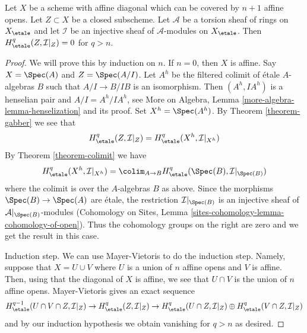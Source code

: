 \begin{lemma}
\label{lemma-vanishing-restriction-injective}
Let $X$ be a scheme with affine diagonal which can be covered by
$n + 1$ affine opens. Let $Z \subset X$ be a closed subscheme.
Let $\mathcal{A}$ be a torsion sheaf of rings on $X_\etale$
and let $\mathcal{I}$ be an injective sheaf of $\mathcal{A}$-modules
on $X_\etale$.
Then $H^q_\etale(Z, \mathcal{I}|_Z) = 0$ for $q > n$.
\end{lemma}

\begin{proof}
We will prove this by induction on $n$. If $n = 0$, then $X$ is affine.
Say $X = \Spec(A)$ and $Z = \Spec(A/I)$. Let $A^h$ be the filtered colimit
of \'etale $A$-algebras $B$ such that $A/I \to B/IB$ is an isomorphism.
Then $(A^h, IA^h)$ is a henselian pair and $A/I = A^h/IA^h$, see
More on Algebra, Lemma \ref{more-algebra-lemma-henselization}
and its proof. Set $X^h = \Spec(A^h)$.
By Theorem \ref{theorem-gabber}
we see that
$$
H^q_\etale(Z, \mathcal{I}|_Z) = H^q_\etale(X^h, \mathcal{I}|_{X^h})
$$
By Theorem \ref{theorem-colimit} we have
$$
H^q_\etale(X^h, \mathcal{I}|_{X^h}) =
\colim_{A \to B} H^q_\etale(\Spec(B), \mathcal{I}|_{\Spec(B)})
$$
where the colimit is over the $A$-algebras $B$ as above.
Since the morphisms $\Spec(B) \to \Spec(A)$ are \'etale,
the restriction $\mathcal{I}|_{\Spec(B)}$ is an injective
sheaf of $\mathcal{A}|_{\Spec(B)}$-modules
(Cohomology on Sites, Lemma \ref{sites-cohomology-lemma-cohomology-of-open}).
Thus the cohomology groups on the right are zero and we get the
result in this case.

\medskip\noindent
Induction step. We can use Mayer-Vietoris to do the induction step.
Namely, suppose that $X = U \cup V$ where $U$ is a union of $n$ affine
opens and $V$ is affine. Then, using that the diagonal of $X$ is affine,
we see that $U \cap V$ is the union of $n$ affine opens. Mayer-Vietoris
gives an exact sequence
$$
H^{q - 1}_\etale(U \cap V \cap Z, \mathcal{I}|_Z) \to
H^q_\etale(Z, \mathcal{I}|_Z) \to
H^q_\etale(U \cap Z, \mathcal{I}|_Z) \oplus
H^q_\etale(V \cap Z, \mathcal{I}|_Z)
$$
and by our induction hypothesis we obtain vanishing for $q > n$ as desired.
\end{proof}
